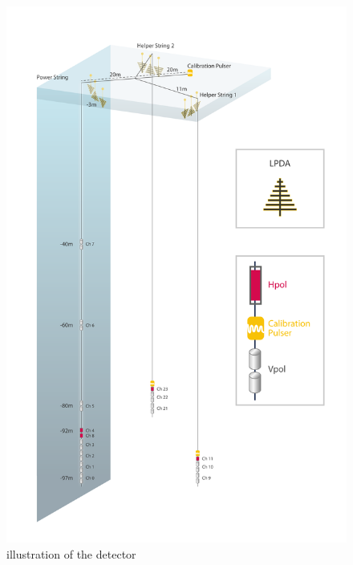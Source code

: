 \documentclass[11pt,a4paper,faculty=we,language=en,doctype=report]{cls/ugent-doc}
\begin{document}
\begin{figure}
	\centering
	\includegraphics[height=0.9\textheight]{figures/detector.pdf}	
	\caption{illustration of the detector}
	\label{fig:detector}
\end{figure}
\end{document}
